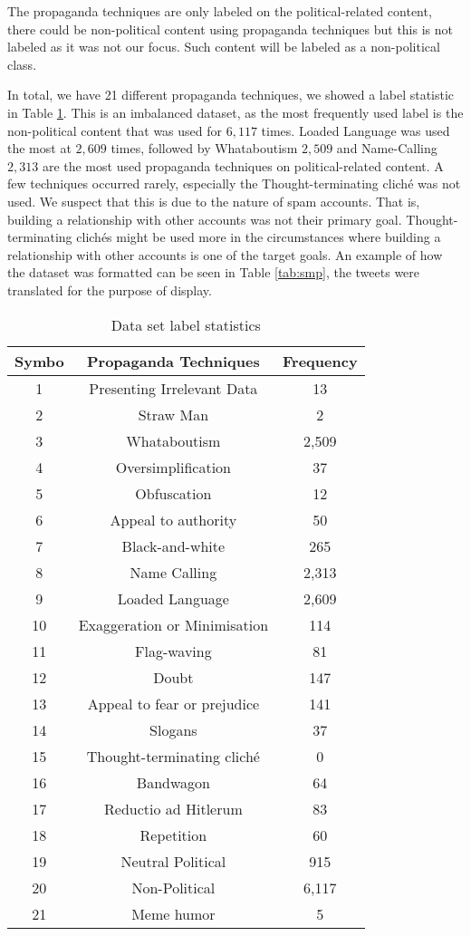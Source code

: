 \documentclass[sigconf]{acmart}
\begin{document}
The propaganda techniques are only labeled on the political-related content, there could be non-political content using propaganda techniques but this is not labeled as it was not our focus. Such content will be labeled as a non-political class.   

In total, we have 21 different propaganda techniques, we showed a label statistic in Table \ref{tab:freq}. This is an imbalanced dataset, as the most frequently used label is the non-political content that was used for $ 6,117$ times.  Loaded Language was used the most at $ 2,609$ times, followed by Whataboutism $ 2,509$ and Name-Calling $ 2,313$ are the most used propaganda techniques on political-related content. A few techniques occurred rarely, especially the Thought-terminating cliché was not used. We suspect that this is due to the nature of spam accounts. That is, building a relationship with other accounts was not their primary goal. Thought-terminating clichés might be used more in the circumstances where building a  relationship with other accounts is one of the target goals. An example of how the dataset was formatted can be seen in Table \ref{tab:smp}, the tweets were translated for the purpose of display. 

\begin{table}[ht]
  \caption{Data set label statistics}
  \label{tab:freq}
  \begin{tabular}{ccc}
    \toprule
    Symbo & Propaganda Techniques & Frequency\\
    \midrule
    1 & Presenting Irrelevant Data & 13\\
    2 & Straw Man & 2\\
    3 & Whataboutism & 2,509\\
    4 & Oversimplification & 37\\
    5& Obfuscation& 12\\
    6& Appeal to authority& 50\\
    7& Black-and-white & 265\\
    8& Name Calling& 2,313\\
    9& Loaded Language& 2,609\\
    10& Exaggeration or Minimisation& 114\\
    11& Flag-waving& 81\\
    12& Doubt& 147\\
    13& Appeal to fear or prejudice & 141\\
    14& Slogans& 37\\
    15& Thought-terminating cliché& 0\\
    16& Bandwagon& 64\\
    17& Reductio ad Hitlerum& 83\\
    18& Repetition& 60\\
    19& Neutral Political & 915\\
    20& Non-Political& 6,117\\
    21& Meme humor& 5\\
    
  \bottomrule
\end{tabular}
\end{table}
\end{document}
